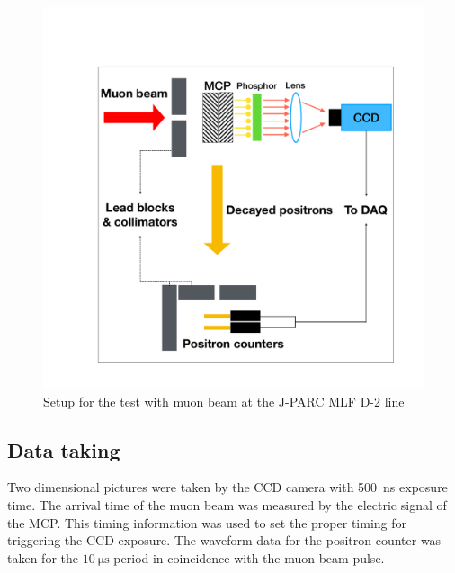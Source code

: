 \documentclass[preprint,3p,twocolumn]{elsarticle}
\begin{document}
\begin{figure}[tb]
{\setlength{\belowdisplayskip}{0pt}
\begin{minipage}[t]{60mm}
\includegraphics[width=1.25\textwidth, height=1.25\textwidth]{figure/BPM_schematic_2.pdf}
\end{minipage}
}
\caption{Setup for the test with muon beam at the J-PARC MLF D-2 line}
\vspace{-0.4cm}
\label{fig:simulation}
\end{figure}

\subsection{Data taking} 
Two dimensional pictures were taken by the CCD camera with \SI{500}{\nano\s} exposure time.
The arrival time of the muon beam was measured by the electric signal of the MCP. This timing information was used 
to set the proper timing for triggering the CCD exposure. The waveform data for the positron counter was taken for the $\SI{10}{\micro\s}$ period in coincidence with the muon beam pulse.
\end{document}
